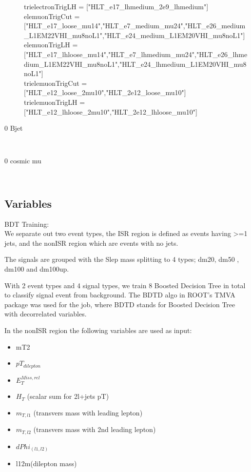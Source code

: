 \begin{description}
trielectronTrigLH = ["HLT\_e17\_lhmedium\_2e9\_lhmedium"]\\

elemuonTrigCut = ["HLT\_e17\_loose\_mu14","HLT\_e7\_medium\_mu24","HLT\_e26\_medium\_L1EM22VHI\_mu8noL1","HLT\_e24\_medium\_L1EM20VHI\_mu8noL1"]\\

elemuonTrigLH = ["HLT\_e17\_lhloose\_mu14","HLT\_e7\_lhmedium\_mu24","HLT\_e26\_lhmedium\_L1EM22VHI\_mu8noL1","HLT\_e24\_lhmedium\_L1EM20VHI\_mu8noL1"]\\

trielemuonTrigCut = ["HLT\_e12\_loose\_2mu10","HLT\_2e12\_loose\_mu10"]\\

trielemuonTrigLH = ["HLT\_e12\_lhloose\_2mu10","HLT\_2e12\_lhloose\_mu10"]\\

\item [0 Bjet]\ \\
\item [0 cosmic mu]\ \\
\end{description}


\subsection{Variables}
BDT Training:\\
We separate out two event types, the ISR region is defined as events having >=1 jets, and the nonISR region which are events with no jets.

The signals are grouped with the Slep mass splitting to 4 types; dm20, dm50 , dm100 and dm100up.

With 2 event types and 4 signal types, we train 8 Boosted Decision Tree in total to classify signal event from background. The BDTD algo in ROOT's TMVA package was used for the job, where BDTD stands for Boosted Decision Tree with decorrelated variables. 

In the nonISR region the following variables are used as input:
\begin{itemize}
\item mT2
\item $pT_{dilepton}$
\item $E_{T}^{Miss,rel}$
\item $H_T$ (scalar sum for 2l+jets pT)
\item $m_{T,l1}$ (transvers mass with leading lepton)
\item $m_{T,l2}$ (transvers mass with 2nd leading lepton)
\item $dPhi_{(l1,l2)}$
\item l12m(dilepton mass)

\end{itemize}

